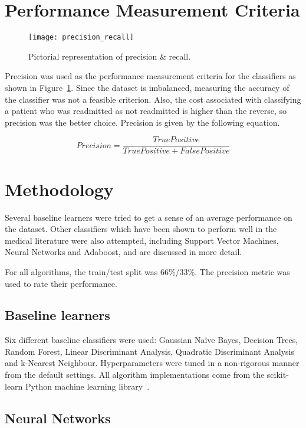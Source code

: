 \documentclass[conference]{IEEEtran}
\begin{document}
\section{Performance Measurement Criteria}

\begin{figure}[htpb]
	\centering
	\texttt{[image: precision\_recall]}
	\caption{Pictorial representation of precision \& recall.}
	\label{fig:precision_recall}
\end{figure}

Precision was used as the performance measurement criteria for the classifiers as shown in Figure~\ref{fig:precision_recall}. Since the dataset is imbalanced, measuring the accuracy of the classifier was not a feasible criterion. Also, the cost associated with classifying a patient who was readmitted as not readmitted is higher than the reverse, so precision was the better choice. Precision is given by the following equation.

\[ Precision = \frac{True Positive}{True Positive + False Positive} \]

\section{Methodology}

Several baseline learners were tried to get a sense of an average performance on the dataset. Other classifiers which have been shown to perform well in the medical literature were also attempted, including Support Vector Machines, Neural Networks and Adaboost, and are discussed in more detail.

For all algorithms, the train/test split was 66\%/33\%. The precision metric was used to rate their performance.

\subsection{Baseline learners}

Six different baseline classifiers were used: Gaussian Naïve Bayes, Decision Trees, Random Forest, Linear Discriminant Analysis, Quadratic Discriminant Analysis and k-Nearest Neighbour. Hyperparameters were tuned in a non-rigorous manner from the default settings. All algorithm implementations come from the scikit-learn Python machine learning library~\cite{scikit-learn}.

\subsection{Neural Networks}
\end{document}
